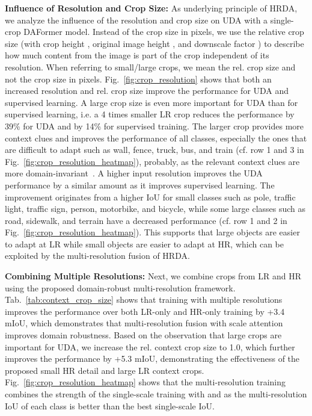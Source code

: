 \documentclass[journal,compsoc]{IEEEtran}
\begin{document}
\noindent\textbf{Influence of Resolution and Crop Size:}
As underlying principle of HRDA, we analyze the influence of the resolution and crop size on UDA with a single-crop DAFormer model.
Instead of the crop size in pixels, we use the relative crop size  (with crop height , original image height , and downscale factor ) to describe how much content from the image is part of the crop independent of its resolution. When referring to small/large crops, we mean the rel. crop size and not the crop size in pixels.
Fig.~\ref{fig:crop_resolution} shows that both an increased resolution and rel. crop size improve the performance for UDA and supervised learning. 
A large crop size is even more important for UDA than for supervised learning, i.e. a 4 times smaller LR crop reduces the performance by 39\% for UDA and by 14\% for supervised training. The larger crop provides more context clues and improves the performance of all classes, especially the ones that are difficult to adapt such as wall, fence, truck, bus, and train (cf. row 1 and 3 in Fig.~\ref{fig:crop_resolution_heatmap}), probably, as the relevant context clues are more domain-invariant~\cite{huang2020contextual, yang2021context}.
A higher input resolution improves the UDA performance by a similar amount as it improves supervised learning. The improvement originates from a higher IoU for small classes such as pole, traffic light, traffic sign, person, motorbike, and bicycle, while some large classes such as road, sidewalk, and terrain have a decreased performance (cf. row 1 and 2 in Fig.~\ref{fig:crop_resolution_heatmap}). This supports that large objects are easier to adapt at LR while small objects are easier to adapt at HR, which can be exploited by the multi-resolution fusion of HRDA.

\noindent\textbf{Combining Multiple Resolutions:} Next, we combine crops from LR and HR using the proposed domain-robust multi-resolution framework. Tab.~\ref{tab:context_crop_size} shows that training with multiple resolutions improves the performance over both LR-only and HR-only training by +3.4 mIoU, which demonstrates that multi-resolution fusion with scale attention improves domain robustness. Based on the observation that large crops are important for UDA, we increase the rel. context crop size to 1.0, which further improves the performance by +5.3 mIoU, demonstrating the effectiveness of the proposed small HR detail and large LR context crops. Fig.~\ref{fig:crop_resolution_heatmap} shows that the multi-resolution training combines the strength of the single-scale training with  and  as the multi-resolution IoU of each class is better than the best single-scale IoU.
\end{document}
